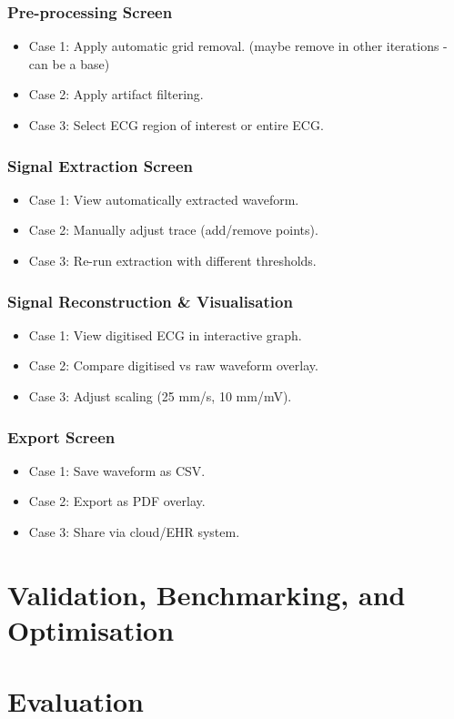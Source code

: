 \subsubsection{Pre-processing Screen}
\begin{itemize}
    \item Case 1: Apply automatic grid removal. (maybe remove in other iterations - can be a base)
    \item Case 2: Apply artifact filtering.
    \item Case 3: Select ECG region of interest or entire ECG. 
\end{itemize}

\subsubsection{Signal Extraction Screen}
\begin{itemize}
    \item Case 1: View automatically extracted waveform.
    \item Case 2: Manually adjust trace (add/remove points).
    \item Case 3: Re-run extraction with different thresholds.
\end{itemize}

\subsubsection{Signal Reconstruction \& Visualisation}
\begin{itemize}
    \item Case 1: View digitised ECG in interactive graph.
    \item Case 2: Compare digitised vs raw waveform overlay.
    \item Case 3: Adjust scaling (25 mm/s, 10 mm/mV).
\end{itemize}

\subsubsection{Export Screen}
\begin{itemize}
    \item Case 1: Save waveform as CSV.
    \item Case 2: Export as PDF overlay.
    \item Case 3: Share via cloud/EHR system.
\end{itemize}


\section{Validation, Benchmarking, and Optimisation}

\section{Evaluation}
